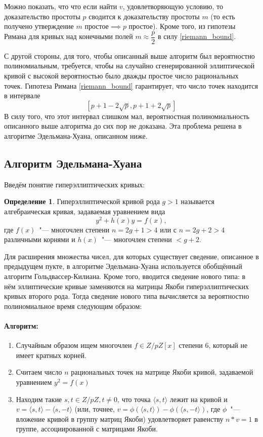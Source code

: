 \documentclass[12pt]{article}
\theoremstyle{definition}
\newtheorem{Def}{Определение}
\numberwithin{Def}{section}
\numberwithin{Th}{section}
\numberwithin{St}{section}
\numberwithin{Cor}{section}
\begin{document}
Можно показать, что что если найти $v$, удовлетворяющую условию, то
доказательство простоты $p$ сводится к доказательству простоты $m$ (то есть
получено утверждение $m\text{ простое}\implies p\text{ простое}$). Кроме того,
из гипотезы Римана для кривых над конечными полей $m\approx\dfrac p2$ в силу
\eqref{riemann_bound}.

С другой стороны, для того, чтобы описанный выше алгоритм был вероятностно
полиномиальным, требуется, чтобы на случайно сгенерированной эллиптической кривой
с высокой вероятностью было дважды простое число рациональных точек. Гипотеза
Римана \eqref{riemann_bound} гарантирует, что число точек находится в интервале
$$
[p+1-2\sqrt{p},p+1+2\sqrt{p}]
$$
В силу того, что этот интервал слишком мал, вероятностная полиномиальность
описанного выше алгоритма до сих пор не доказана. Эта проблема решена в алгоритме
Эдельмана-Хуана, описанном ниже.

\subsection{Алгоритм Эдельмана-Хуана}

Введём понятие гиперэллиптических кривых:

\begin{Def}
	Гиперэллиптической кривой рода $g>1$ называется алгебраическая кривая,
	задаваемая уравнением вида
	$$
	y^2+h(x)y=f(x),
	$$
	где $f(x)$~"--- многочлен степени $n=2g+1>4$ или с $n=2g+2>4$ различными
	корнями и $h(x)$~"--- многочлен степени $<g+2$.
\end{Def}

Для расширения множества чисел, для которых существует сведение, описанное
в предыдущем пукте, в алгоритме Эдельмана-Хуана используется обобщённый
алгоритм Гольдвассер-Килиана. Кроме того, вводится сведение нового типа:
в нём эллиптические кривые заменяются на матрицы Якоби гиперэллиптических
кривых второго рода. Тогда сведение нового типа вычисляется за вероятностно
полиномиальное время следующим образом:

\paragraph{Алгоритм:}
\begin{enumerate}[1)]
	\item Случайным образом ищем многочлен $f\in Z/pZ[x]$ степени 6,
который не имеет кратных корней.
	\item Считаем число $n$ рациональных точек на матрице Якоби кривой,
	задаваемой уравнением $y^2=f(x)$
	\item Находим такие $s,t\in Z/pZ, t\neq0$, что точка $\langle s,t \rangle$
	лежит на кривой и ${v=\langle s,t\rangle-\langle s,-t \rangle}$ (или, точнее,
	${v=\phi(\langle s,t\rangle)-\phi(\langle s,-t \rangle)}$, где $\phi$~"---
	вложение кривой в группу матриц Якоби) удовлетворяет равенству $n*v=1$ в 
	группе, ассоциированной с матрицами Якоби.
\end{enumerate}
\end{document}
